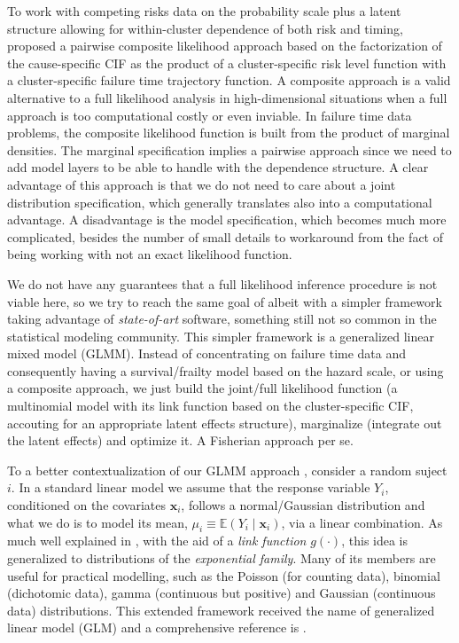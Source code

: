 To work with competing risks data on the probability scale plus a latent
structure allowing for within-cluster dependence of both risk and
timing,  proposed a pairwise composite likelihood
approach based on the factorization of the cause-specific CIF as the
product of a cluster-specific risk level function with a
cluster-specific failure time trajectory function. A composite approach
\cite{lindsay88, cox&reid04, varin11} is a valid alternative to a full
likelihood analysis in high-dimensional situations when a full approach
is too computational costly or even inviable. In failure time data
problems, the composite likelihood function is built from the product of
marginal densities. The marginal specification implies a pairwise
approach since we need to add model layers to be able to handle with the
dependence structure. A clear advantage of this approach is that we do
not need to care about a joint distribution specification, which
generally translates also into a computational advantage. A disadvantage
is the model specification, which becomes much more complicated, besides
the number of small details to workaround from the fact of being working
with not an exact likelihood function.

We do not have any guarantees that a full likelihood inference procedure
is not viable here, so we try to reach the same goal of
 albeit with a simpler framework taking advantage of
\textit{state-of-art} software, something still not so common in the
statistical modeling community. This simpler framework is a generalized
linear mixed model (GLMM). Instead of concentrating on failure time data
and consequently having a survival/frailty model based on the hazard
scale, or using a composite approach, we just build the joint/full
likelihood function (a multinomial model with its link function based on
the cluster-specific CIF, accouting for an appropriate latent effects
structure), marginalize (integrate out the latent effects) and optimize
it. A Fisherian approach per se.

To a better contextualization of our GLMM approach \cite{GLMM}, consider
a random suject \(i\). In a standard linear model we assume that the
response variable \(Y_{i}\), conditioned on the covariates
\(\bm{x}_{i}\), follows a normal/Gaussian distribution and what we do is
to model its mean, \(\mu_{i} \equiv \mathbb{E}(Y_{i} \mid \bm{x}_{i})\),
via a linear combination. As much well explained in ,
with the aid of a \textit{link function} \(g(\cdot)\), this idea is
generalized to distributions of the \textit{exponential family}. Many of
its members are useful for practical modelling, such as the Poisson (for
counting data), binomial (dichotomic data), gamma (continuous but
positive) and Gaussian (continuous data) distributions. This extended
framework received the name of generalized linear model (GLM) and a
comprehensive reference is .

